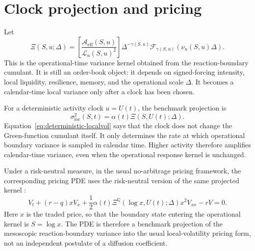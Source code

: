 \documentclass[11pt]{amsart}
\newcommand{\Q}{\mathbb{Q}}
\newcommand{\cL}{\mathcal{L}}
\newcommand{\sigloc}{\sigma_{\mathrm{loc}}}
\newcommand{\Aeff}{\mathcal{A}_{\mathrm{eff}}}
\newcommand{\Fcal}{\mathcal{F}}
\newcommand{\Xiop}{\Xi}
\theoremstyle{definition}
\theoremstyle{plain}
\theoremstyle{remark}
\begin{document}
\section{Clock projection and pricing}

Let
\begin{equation}
 \Xiop(S,u;\Delta)=
 \left[\frac{\Aeff(S,u)}{\cL_u(S,u)^2}\right]
 \Delta^{-\gamma(S,u)}
 \Fcal_{\gamma(S,u)}(\nu_u(S,u)\Delta).
 \label{eq:Xi}
\end{equation}
This is the operational-time variance kernel obtained from the reaction-boundary cumulant. It is still an order-book object: it depends on signed-forcing intensity, local liquidity, resilience, memory, and the operational scale $\Delta$. It becomes a calendar-time local variance only after a clock has been chosen.

For a deterministic activity clock $u=U(t)$, the benchmark projection is
\begin{equation}
\sigloc^2(S,t)=\alpha(t)\Xiop(S,U(t);\Delta).
 \label{eq:deterministic-localvol}
\end{equation}
Equation~\eqref{eq:deterministic-localvol} says that the clock does not change the Green-function cumulant itself. It only determines the rate at which operational boundary variance is sampled in calendar time. Higher activity therefore amplifies calendar-time variance, even when the operational response kernel is unchanged.

Under a risk-neutral measure, in the usual no-arbitrage pricing framework, the corresponding pricing PDE uses the risk-neutral version of the same projected kernel \cite{HarrisonPliska1981,DelbaenSchachermayer1994,Duffie2001}:
\begin{equation}
 V_t+(r-q)xV_x+\frac12\alpha(t)\Xiop^\Q(\log x,U(t);\Delta)x^2V_{xx}-rV=0.
 \label{eq:pde}
\end{equation}
Here $x$ is the traded price, so that the boundary state entering the operational kernel is $S=\log x$. The PDE is therefore a benchmark projection of the mesoscopic reaction-boundary variance into the usual local-volatility pricing form, not an independent postulate of a diffusion coefficient.
\end{document}
